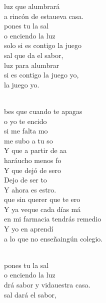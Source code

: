 \documentclass[12pt]{article}
\begin{document}
\begin{multicols*}{2}
\begin{cancion}
\begin{chorus}
	luz que alumbrará\\
	a rincón de estaueva casa.\\
	 pones tu la sal \\
	o enciendo la luz\\
	 solo si es contigo  la juego\\
	 sal que da el sabor, \\
	luz para alumbrar\\
	 si es contigo  la juego yo,\\
	 la juego yo.\\
	\end{chorus}%
	\jump\\
	bes que cuando te apagas \\
	o yo te encido\\
	 si me falta mo \\
	me subo a tu so\\
	Y  que a partir de aa \\
	haráucho menos fo \\
	Y  que dejó de sero \\
	Dejo de ser to\\
	Y ahora es estro.\\
	 que sin querer que te ero\\
	Y ya veque cada días má\\
	 en mi farmacia tendrás remedio\\
	Y yo en  aprendí \\
	a lo que no enseñaingún colegio.\\\jump\\
	\begin{chorus}%
	 pones tu la sal \\
	o enciendo la luz\\
	drá sabor y vidauestra casa.\\
	 sal dará el sabor, \\

\end{chorus}
\end{cancion}
\end{multicols*}
\end{document}
